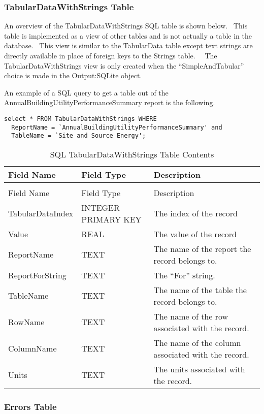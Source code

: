 \subsubsection{TabularDataWithStrings Table}

An overview of the TabularDataWithStrings SQL table is shown below.  This table is implemented as a view of other tables and is not actually a table in the database.  This view is similar to the TabularData table except text strings are directly available in place of foreign keys to the Strings table.   The TabularDataWithStrings view is only created when the “SimpleAndTabular” choice is made in the Output:SQLite object.

An example of a SQL query to get a table out of the AnnualBuildingUtilityPerformanceSummary report is the following.

\begin{lstlisting}
select * FROM TabularDataWithStrings WHERE
  ReportName = `AnnualBuildingUtilityPerformanceSummary' and
  TableName = `Site and Source Energy';
\end{lstlisting}

\begin{longtable}[c]{>{\raggedright}p{1.5in}>{\raggedright}p{1.5in}>{\raggedright}p{3in}}
\caption{SQL TabularDataWithStrings Table Contents \label{table:table-41.-sql-tabulardatawithstrings-table}} \tabularnewline
\toprule 
Field Name & Field Type & Description \tabularnewline
\midrule
\endfirsthead

\caption[]{SQL TabularDataWithStrings Table Contents} \tabularnewline
\toprule 
Field Name & Field Type & Description \tabularnewline
\midrule
\endhead

TabularData\-Index & INTEGER PRIMARY KEY & The index of the record \tabularnewline
Value & REAL & The value of the record \tabularnewline
ReportName & TEXT & The name of the report the record belongs to. \tabularnewline
ReportFor\-String & TEXT & The “For” string. \tabularnewline
TableName & TEXT & The name of the table the record belongs to. \tabularnewline
RowName & TEXT & The name of the row associated with the record. \tabularnewline
ColumnName & TEXT & The name of the column associated with the record. \tabularnewline
Units & TEXT & The units associated with the record. \tabularnewline
\bottomrule
\end{longtable}

\subsubsection{Errors Table}\label{errors-table}

